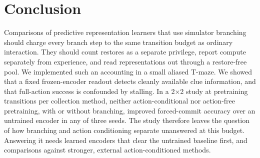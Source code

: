 \section{Conclusion}
\label{sec:conclusion}

Comparisons of predictive representation learners that use simulator branching should charge every branch step to the same transition budget as ordinary interaction. They should count restores as a separate privilege, report compute separately from experience, and read representations out through a restore-free pool. We implemented such an accounting in a small aliased T-maze. We showed that a fixed frozen-encoder readout detects cleanly available clue information, and that full-action success is confounded by stalling. In a 2$\times$2 study at \StudyCfgPretrainBudget{} pretraining transitions per collection method, neither action-conditional nor action-free pretraining, with or without branching, improved forced-commit accuracy over an untrained encoder in any of three seeds. The study therefore leaves the question of how branching and action conditioning separate unanswered at this budget. Answering it needs learned encoders that clear the untrained baseline first, and comparisons against stronger, external action-conditioned methods.
